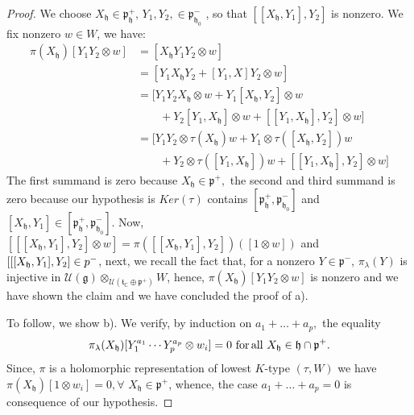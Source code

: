 \documentclass[12pt]{amsart}
\theoremstyle{definition}
\theoremstyle{remark}
\newcommand{\g}{\mathfrak{g}}
\newcommand{\h}{\mathfrak{h}}
\newcommand{\p}{\mathfrak p}
\renewcommand{\t}{{\mathfrak t}}
\newcommand{\C}{{\mathbb C}}
\numberwithin{equation}{section}
\begin{document}
\begin{proof}
We   choose $X_{\h} \in  \p_{\h}^+, \, Y_1, Y_2, \in
  \p_{\h_0}^-$  ,
so that $[[X_{\h}, Y_{1}]  , Y_{2}] $  is nonzero. We fix nonzero $w \in W$, we have:
 \begin{equation*} \begin{split} \pi (X_{\h})[Y_1 Y_2 \otimes w]   &=  [X_{\h}Y_1Y_2 \otimes w]
  \\ & =
 [Y_1X_{\h} Y_2 + [Y_1,X]Y_2 \otimes w ]
\\ & = [ Y_1Y_2X_{\h} \otimes w + Y_1[X_{\h} ,Y_2]\otimes w \\ & \quad \quad +Y_2[Y_1,X_{\h}]\otimes w
+[[Y_1,X_{\h}],Y_2] \otimes w ]
\\ & = [Y_1Y_2\otimes \tau(X_{\h})w + Y_1 \otimes \tau([X_{\h},Y_2])w \\ &
\quad \quad + Y_2\otimes  \tau([Y_1,X_{\h}])w +
[[Y_1,X_{\h}],Y_2] \otimes w] \end{split}
\end{equation*}
  The first summand is zero because $X_{\h} \in \p^+, $
the second and third summand is zero because  our hypothesis is $Ker(\tau)$ contains
$[\p_\h^+ , \p_{\h_0}^-]$ and
  $[X_{\h}, Y_{1}]
\in [\p_\h^+ , \p_{\h_0}^-] $.
Now,  $ [[[X_{\h}, Y_{1}]  , Y_{2}]\otimes w] = \pi ([[X_{\h}, Y_{1}]  ,
Y_{2}]) ([1\otimes w])$
 and
             $[[[X_{\h}, Y_{1}]  , Y_{2}] \in \mathfrak   \p^- $, next, we recall
              the fact that,  for a nonzero $Y \in \p^-$, $\pi_\lambda (Y)$
is injective in $ \mathcal U(\g) \otimes_{\mathcal U(\t_\C \oplus \p^+)} W $, hence,
  $ \pi (X_{\h})[Y_{1}
Y_{2} \otimes w]$ is nonzero and we have shown the claim and we have
concluded the proof of a).

To follow, we show b).       We verify, by induction on $a_1 +\dots +a_p,$
the equality \begin{equation*}\pi_\lambda(X_{\h} ) [Y_{1}^{a_1} \cdots Y_{p}^{a_p}
\otimes w_i]=0 \,\,\text{for\,all}\,\,X_{\h} \in \h \cap \p^+. \end{equation*}
Since, $\pi$ is a  holomorphic representation of lowest $K$-type $(\tau,W)$
we have $\pi(X_{\h})[1\otimes w_i]=0, \forall \,\,X_\h
\in \p^+ $,  whence, the case  $a_1 +\dots +a_p =0$ is consequence of our hypothesis.


\end{proof}
\end{document}
